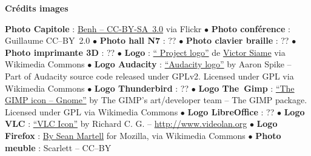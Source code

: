 
\vfill
\begin{center}
\textcolor{Cdl}{\textbf{Crédits images}} \par
{\tiny
\textbf{Photo Capitole} : \href{https://www.flickr.com/photos/blieusong/6986608500/in/set-72157629942158013}{Benh  -- CC-BY-SA~3.0} via Flickr \textcolor{Cdl}{$\bullet$} \textbf{Photo conférence } : Guillaume  CC--BY~2.0 \textcolor{Cdl}{$\bullet$} \textbf{Photo hall N7} : ?? \textcolor{Cdl}{$\bullet$} \textbf{Photo clavier braille} : ?? \textcolor{Cdl}{$\bullet$} \textbf{Photo imprimante 3D} : ?? \textcolor{Cdl}{$\bullet$} \textbf{Logo } : \href{https://commons.wikimedia.org/wiki/File\%3AOfficial_gnu.svg"><img width="512" alt="Official gnu" src="//upload.wikimedia.org/wikipedia/commons/thumb/3/39/Official_gnu.svg/512px-Official_gnu.svg.png}{“ Project logo”} de \href{mailto:vcopovi@wanadoo.fr}{Victor Siame} via Wikimedia Commons \textcolor{Cdl}{$\bullet$} \textbf{Logo Audacity} : \href{https://commons.wikimedia.org/wiki/File:Audacity_Logo.svg#/media/File:Audacity_Logo.svg}{“Audacity logo”} by Aaron Spike -- Part of Audacity source code released under GPLv2. Licensed under GPL via Wikimedia Commons \textcolor{Cdl}{$\bullet$} \textbf{Logo Thunderbird} : ?? \textcolor{Cdl}{$\bullet$} \textbf{Logo The~Gimp} : \href{https://commons.wikimedia.org/wiki/File:The_GIMP_icon_-_gnome.svg#/media/File:The_GIMP_icon_-_gnome.svg}{“The GIMP icon -- Gnome”} by The GIMP's art/developer team -- The GIMP package. Licensed under GPL via Wikimedia Commons \textcolor{Cdl}{$\bullet$} \textbf{Logo LibreOffice} : ?? \textcolor{Cdl}{$\bullet$} \textbf{Logo VLC} : \href{https://commons.wikimedia.org/wiki/File:VLC_Icon.svg#/media/File:VLC_Icon.svg}{“VLC Icon”} by Richard C. G.  -- \url{http://www.videolan.org} \textcolor{Cdl}{$\bullet$} \textbf{Logo Firefox} : \href{https://commons.wikimedia.org/wiki/File\%3AMozilla_Firefox_logo_2013.svg}{By Sean Martell} for Mozilla, via Wikimedia Commons \textcolor{Cdl}{$\bullet$} \textbf{Photo meuble} : Scarlett  -- CC--BY

}
\end{center}